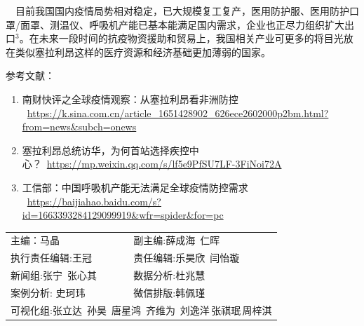 \documentclass[]{article}
\begin{document}
\(\quad\)目前我国国内疫情局势相对稳定，已大规模复工复产，医用防护服、医用防护口罩/面罩、测温仪、呼吸机产能已基本能满足国内需求，企业也正尽力组织扩大出口\(^3\)。在未来一段时间的抗疫物资援助和贸易上，我国相关产业可更多的将目光放在类似塞拉利昂这样的医疗资源和经济基础更加薄弱的国家。

\Large 参考文献：

\begin{enumerate}
\def\labelenumi{\arabic{enumi}.}
\item
  南财快评之全球疫情观察：从塞拉利昂看非洲防控
  ~\url{https://k.sina.com.cn/article_1651428902_626ece2602000p2bm.html?from=news\&subch=onews}
\item
  塞拉利昂总统访华，为何首站选择疾控中心？~\url{https://mp.weixin.qq.com/s/lf5e9PfSU7LF-3FiNoi72A}
\item
  工信部：中国呼吸机产能无法满足全球疫情防控需求
  ~\url{https://baijiahao.baidu.com/s?id=1663393284129099919\&wfr=spider\&for=pc}
\end{enumerate}

\centering
\fontsize{12}{12}
\selectfont
\begin{tabular}{ll}

主编：马晶  &  副主编:薛成海\,  仁晖  \\
执行责任编辑:王冠  & 责任编辑:乐昊欣\, 闫怡璇 \\
新闻组:张宁\, 张心其  & 数据分析:杜兆慧 \\
案例分析: 史珂玮  &  微信排版:韩佩瑾 \\
\multicolumn{2}{l}{可视化组:张立达\, 孙昊\, 唐星鸿\, 齐维为\, 刘逸洋\,张祺珉\,周梓淇}

\end{tabular}
\end{document}
